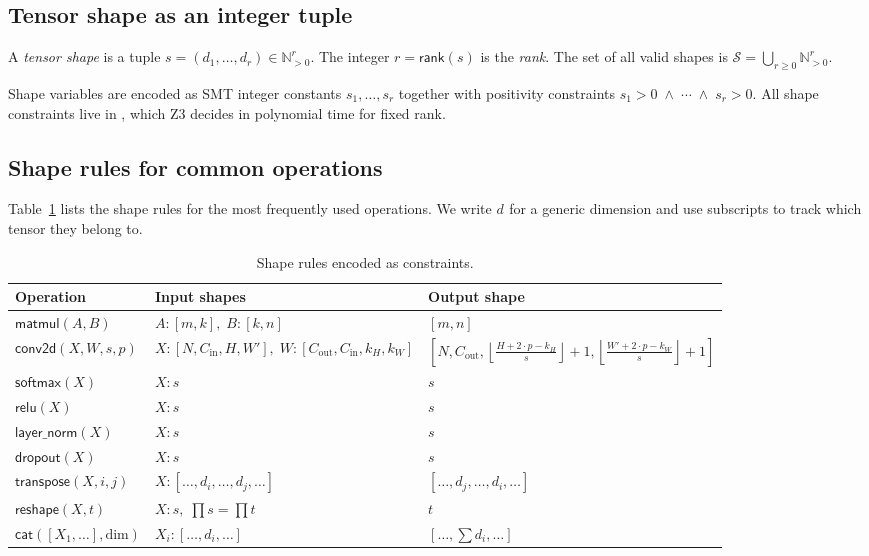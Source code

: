 \documentclass[11pt]{article}
\newcommand{\TRank}[1]{\mathsf{rank}(#1)}          %
\newcommand{\TMatmul}{\mathsf{matmul}}             %
\newcommand{\TSoftmax}{\mathsf{softmax}}           %
\newcommand{\TConv}{\mathsf{conv2d}}               %
\newcommand{\convout}[4]{\left\lfloor\frac{#1+2{\cdot}#3-#2}{#4}\right\rfloor+1}
\newcommand{\dimvar}[1]{d_{#1}}                    %
\begin{document}
\subsection{Tensor shape as an integer tuple}

\begin{definition}
A \emph{tensor shape} is a tuple
$s = (\dimvar{1}, \ldots, \dimvar{r}) \in \mathbb{N}_{>0}^r$.
The integer $r = \TRank{s}$ is the \emph{rank}.  The set of all valid
shapes is $\mathcal{S} = \bigcup_{r \geq 0} \mathbb{N}_{>0}^r$.
\end{definition}

Shape variables are encoded as SMT integer constants
$s_1, \ldots, s_r$ together with positivity constraints
$s_1 > 0 \;\wedge\; \cdots \;\wedge\; s_r > 0$.
All shape constraints live in \QFLIA{}, which Z3 decides in polynomial
time for fixed rank.

\subsection{Shape rules for common operations}

Table~\ref{tab:shape-rules} lists the shape rules for the most
frequently used operations.  We write $\dimvar{}$ for a generic
dimension and use subscripts to track which tensor they belong to.

\begin{table}[H]
\centering
\caption{Shape rules encoded as \QFLIA{} constraints.}
\label{tab:shape-rules}
\setlength{\tabcolsep}{6pt}
\begin{tabular}{@{}lll@{}}
\toprule
\textbf{Operation} & \textbf{Input shapes} & \textbf{Output shape} \\
\midrule
$\TMatmul(A,B)$
  & $A{:}[m,k],\; B{:}[k,n]$
  & $[m,n]$ \\
$\TConv(X,W,s,p)$
  & $X{:}[N,C_\mathrm{in},H,W'],\; W{:}[C_\mathrm{out},C_\mathrm{in},k_H,k_W]$
  & $[N, C_\mathrm{out},
       \convout{H}{k_H}{p}{s},
       \convout{W'}{k_W}{p}{s}]$ \\
$\TSoftmax(X)$   & $X{:}s$ & $s$ \\
$\mathsf{relu}(X)$ & $X{:}s$ & $s$ \\
$\mathsf{layer\_norm}(X)$ & $X{:}s$ & $s$ \\
$\mathsf{dropout}(X)$ & $X{:}s$ & $s$ \\
$\mathsf{transpose}(X,i,j)$ & $X{:}[\ldots,d_i,\ldots,d_j,\ldots]$ &
  $[\ldots,d_j,\ldots,d_i,\ldots]$ \\
$\mathsf{reshape}(X,t)$ & $X{:}s,\; \prod s = \prod t$ & $t$ \\
$\mathsf{cat}([X_1,\ldots],\text{dim})$ &
  $X_i{:}[\ldots,d_i,\ldots]$ & $[\ldots,\sum d_i,\ldots]$ \\
\bottomrule
\end{tabular}
\end{table}
\end{document}
